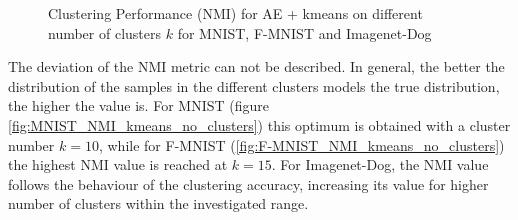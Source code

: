 \documentclass[12pt,DIV14,BCOR12mm,a4paper,footexclude,headinclude,halfparskip-,twoside,openright,cleardoubleempty,idxtotoc,bibtotoc,listtotoc]{scrreprt} %
\numberwithin{equation}{chapter}
\begin{document}
	 \begin{figure}[htb!]
		\centering
		\qquad
		\qquad
		\caption{Clustering Performance (NMI) for AE + kmeans on different number of clusters $k$ for MNIST, F-MNIST and Imagenet-Dog}
		\label{fig:ClusterPerformance_NMI_kmeans_no_clusters}
	\end{figure}
The deviation of the NMI metric can not be described. In general, the better the distribution of the samples in the different clusters models the true distribution, the higher the value is. For MNIST (figure \ref{fig:MNIST_NMI_kmeans_no_clusters}) this optimum is obtained with a cluster number $k=10$, while for F-MNIST (\ref{fig:F-MNIST_NMI_kmeans_no_clusters}) the highest NMI value is reached at $k=15$. For Imagenet-Dog, the NMI value follows the behaviour of the clustering accuracy, increasing its value for higher number of clusters within the investigated range.\\
\end{document}
